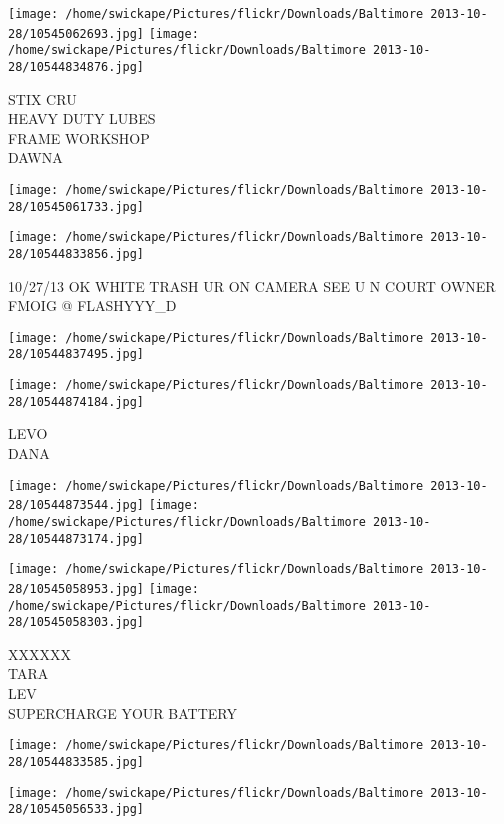 \documentclass[10pt,letterpaper]{article}
\begin{document}
\texttt{[image: /home/swickape/Pictures/flickr/Downloads/Baltimore 2013-10-28/10545062693.jpg]}
\texttt{[image: /home/swickape/Pictures/flickr/Downloads/Baltimore 2013-10-28/10544834876.jpg]}

STIX CRU\\
HEAVY DUTY LUBES\\
FRAME WORKSHOP\\
DAWNA
\pagebreak

\texttt{[image: /home/swickape/Pictures/flickr/Downloads/Baltimore 2013-10-28/10545061733.jpg]}

\vspace{0.25in}
\texttt{[image: /home/swickape/Pictures/flickr/Downloads/Baltimore 2013-10-28/10544833856.jpg]}

10/27/13 OK WHITE TRASH UR ON CAMERA SEE U N COURT OWNER\\
FMOIG @ FLASHYYY\_D
\pagebreak

\texttt{[image: /home/swickape/Pictures/flickr/Downloads/Baltimore 2013-10-28/10544837495.jpg]}

\vspace{0.25in}
\texttt{[image: /home/swickape/Pictures/flickr/Downloads/Baltimore 2013-10-28/10544874184.jpg]}

LEVO\\
DANA
\pagebreak

\texttt{[image: /home/swickape/Pictures/flickr/Downloads/Baltimore 2013-10-28/10544873544.jpg]}
\texttt{[image: /home/swickape/Pictures/flickr/Downloads/Baltimore 2013-10-28/10544873174.jpg]}

\texttt{[image: /home/swickape/Pictures/flickr/Downloads/Baltimore 2013-10-28/10545058953.jpg]}
\texttt{[image: /home/swickape/Pictures/flickr/Downloads/Baltimore 2013-10-28/10545058303.jpg]}

XXXXXX\\
TARA\\
LEV\\
SUPERCHARGE YOUR BATTERY
\pagebreak

\texttt{[image: /home/swickape/Pictures/flickr/Downloads/Baltimore 2013-10-28/10544833585.jpg]}

\vspace{0.25in}
\texttt{[image: /home/swickape/Pictures/flickr/Downloads/Baltimore 2013-10-28/10545056533.jpg]}
\end{document}
